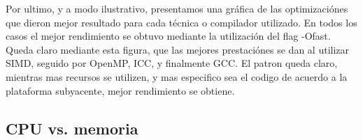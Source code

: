 Por ultimo, y a modo ilustrativo, presentamos una gráfica de las optimizaciónes que dieron mejor resultado para cada técnica o compilador utilizado. En todos los casos el mejor rendimiento se obtuvo mediante la utilización del flag -Ofast. Queda claro mediante esta figura, que las mejores prestaciónes se dan al utilizar SIMD, seguido por OpenMP, ICC, y finalmente GCC. El patron queda claro, mientras mas recursos se utilizen, y mas especifico sea el codigo de acuerdo a la plataforma subyacente, mejor rendimiento se obtiene. 


\subsection{CPU vs. memoria}
